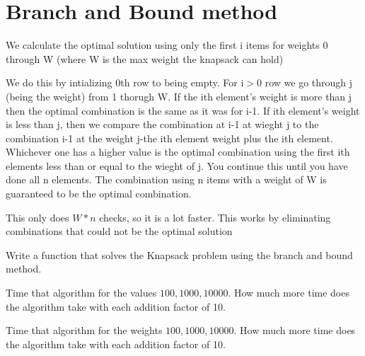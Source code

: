 \section*{Branch and Bound method}
We calculate the optimal solution using only the first i items for weights 0 through W (where W is the max weight the knapsack can hold) 

We do this by intializing 0th row to being empty.
For i$>$0 row we go through j (being the weight) from 1 thorugh W. If the ith element's weight is more than j then the optimal combination is the same as it was for i-1. If ith element's weight is less than j, then we compare the combination at i-1 at wieght j to the combination i-1 at the weight j-the ith element weight plus the ith element. Whichever one has a higher value is the optimal combination using the first ith elements less than or equal to the wieght of j. You continue this until you have done all n elements. The combination using n items with a weight of W is guaranteed to be the optimal combination.

This only does $W*n$ checks, so it is a lot faster. This works by eliminating combinations that could not be the optimal solution

\begin{problem}
Write a function that solves the Knapsack problem using the branch and bound method.
\end{problem}

\begin{problem}
Time that algorithm for the values $100, 1000, 10000$. How much more time does the algorithm take with each addition factor of 10.
\end{problem}

\begin{problem}
Time that algorithm for the weights $100, 1000, 10000$. How much more time does the algorithm take with each addition factor of 10.
\end{problem}
